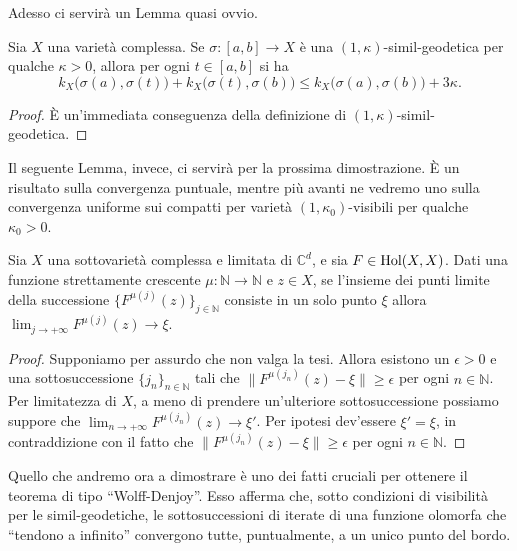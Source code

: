 Adesso ci servirà un Lemma quasi ovvio.

\begin{lm} \label{quasiovvio}
    Sia $X$ una varietà complessa. Se $\sigma:[a,b] \longrightarrow X$ è una $(1,\kappa)$-simil-geodetica per qualche $\kappa>0$, allora per ogni $t \in [a,b]$ si ha
    $$k_X\big(\sigma(a),\sigma(t)\big)+k_X\big(\sigma(t),\sigma(b)\big) \le k_X\big(\sigma(a),\sigma(b)\big)+3\kappa.$$
\end{lm}

\begin{proof}
    È un'immediata conseguenza della definizione di $(1,\kappa)$-simil-geodetica.
\end{proof}

Il seguente Lemma, invece, ci servirà per la prossima dimostrazione. È un risultato sulla convergenza puntuale, mentre più avanti ne vedremo uno sulla convergenza uniforme sui compatti per varietà $(1,\kappa_0)$-visibili per qualche $\kappa_0>0$.

\begin{lm} \label{lemmasottosotto1}
    Sia $X$ una sottovarietà complessa e limitata di $\mathbb{C}^d$, e sia $F\in\textnormal{Hol}(X,X)$. Dati una funzione strettamente crescente $\mu:\mathbb{N}\longrightarrow\mathbb{N}$ e $z\in X$, se l'insieme dei punti limite della successione $\{F^{\mu(j)}(z)\}_{j\in\mathbb{N}}$ consiste in un solo punto $\xi$ allora $\displaystyle\lim_{j\longrightarrow+\infty}F^{\mu(j)}(z)\longrightarrow\xi$.
\end{lm}

\begin{proof}
    Supponiamo per assurdo che non valga la tesi. Allora esistono un $\epsilon>0$ e una sottosuccessione $\{j_n\}_{n\in\mathbb{N}}$ tali che $\|F^{\mu(j_n)}(z)-\xi\| \ge \epsilon$ per ogni $n\in\mathbb{N}$. Per limitatezza di $X$, a meno di prendere un'ulteriore sottosuccessione possiamo suppore che $\displaystyle\lim_{n\longrightarrow+\infty}F^{\mu(j_n)}(z)\longrightarrow\xi'$. Per ipotesi dev'essere $\xi'=\xi$, in contraddizione con il fatto che $\|F^{\mu(j_n)}(z)-\xi\| \ge \epsilon$ per ogni $n\in\mathbb{N}$.
\end{proof}

Quello che andremo ora a dimostrare è uno dei fatti cruciali per ottenere il teorema di tipo ``Wolff-Denjoy''. Esso afferma che, sotto condizioni di visibilità per le simil-geodetiche, le sottosuccessioni di iterate di una funzione olomorfa che ``tendono a infinito'' convergono tutte, puntualmente, a un unico punto del bordo.

